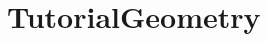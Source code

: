 \hypertarget{group___tutorial_geometry}{}\section{Tutorial\+Geometry}
\label{group___tutorial_geometry}
